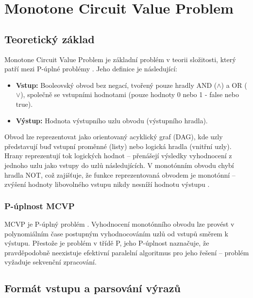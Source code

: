 \chapter{Monotone Circuit Value Problem}
\label{sec:MCVP}

\section{Teoretický základ}
\label{sec:MCVPTheory}

Monotone Circuit Value Problem je základní problém v teorii složitosti, který patří mezi P-úplné problémy \cite{sawa}. Jeho definice je následující:

\begin{itemize}
    \item \textbf{Vstup:} Booleovský obvod bez negací, tvořený pouze hradly AND ($\land$) a OR ($\lor$), společně se vstupními hodnotami (pouze hodnoty 0 nebo 1 - false nebo true).
    \item \textbf{Výstup:} Hodnota výstupního uzlu obvodu (výstupního hradla).
\end{itemize}

Obvod lze reprezentovat jako orientovaný acyklický graf (DAG), kde uzly představují buď vstupní proměnné (listy) nebo logická hradla (vnitřní uzly). Hrany reprezentují tok logických hodnot – přenášejí výsledky vyhodnocení z jednoho uzlu jako vstupy do uzlů následujících. V monotónním obvodu chybí hradla NOT, což zajišťuje, že funkce reprezentovaná obvodem je monotónní – zvýšení hodnoty libovolného vstupu nikdy nesníží hodnotu výstupu \cite{sawa}.

\subsection{P-úplnost MCVP}

\label{sec:MCVPCompleteness}

MCVP je P-úplný problém \cite{sawa, miyano}. Vyhodnocení monotónního obvodu lze provést v polynomiálním čase postupným vyhodnocováním uzlů od vstupů směrem k výstupu. Přestože je problém v třídě P, jeho P-úplnost naznačuje, že pravděpodobně neexistuje efektivní paralelní algoritmus pro jeho řešení – problém vyžaduje sekvenční zpracování.

\section{Formát vstupu a parsování výrazů}
\label{sec:MCVPParsing}

